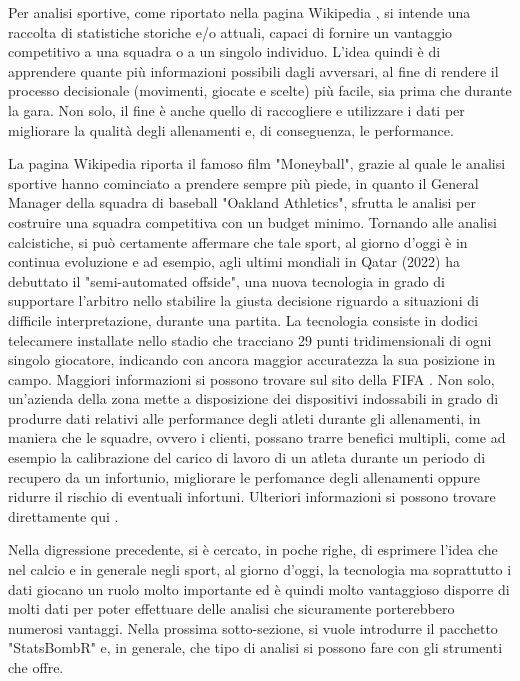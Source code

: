         Per analisi sportive, come riportato nella pagina Wikipedia \cite{SportAnalytics}, si intende una raccolta di statistiche storiche e/o attuali, capaci di fornire un vantaggio competitivo a una squadra o a un singolo individuo. L'idea quindi è di apprendere quante più informazioni possibili dagli avversari, al fine di rendere il processo decisionale (movimenti, giocate e scelte) più facile, sia prima che durante la gara. Non solo, il fine è anche quello di raccogliere e utilizzare i dati per migliorare la qualità degli allenamenti e, di conseguenza, le performance. 
        
        La pagina Wikipedia riporta il famoso film "Moneyball", grazie al quale le analisi sportive hanno cominciato a prendere sempre più piede, in quanto il General Manager della squadra di baseball "Oakland Athletics", sfrutta le analisi per costruire una squadra competitiva con un budget minimo. Tornando alle analisi calcistiche, si può certamente affermare che tale sport, al giorno d'oggi è in continua evoluzione e ad esempio, agli ultimi mondiali in Qatar (2022) ha debuttato il "semi-automated offside", una nuova tecnologia in grado di supportare l'arbitro nello stabilire la giusta decisione riguardo a situazioni di difficile interpretazione, durante una partita. La tecnologia consiste in dodici telecamere installate nello stadio che tracciano 29 punti tridimensionali di ogni singolo giocatore, indicando con ancora maggior accuratezza la sua posizione in campo. Maggiori informazioni si possono trovare sul sito della FIFA \cite{Semi-auto-offside}. Non solo, un'azienda della zona mette a disposizione dei dispositivi indossabili in grado di produrre dati relativi alle performance degli atleti durante gli allenamenti, in maniera che le squadre, ovvero i clienti, possano trarre benefici multipli, come ad esempio la calibrazione del carico di lavoro di un atleta durante un periodo di recupero da un infortunio, migliorare le perfomance degli allenamenti oppure ridurre il rischio di eventuali infortuni. Ulteriori informazioni si possono trovare direttamente qui \cite{gpexe}.

        Nella digressione precedente, si è cercato, in poche righe, di esprimere l'idea che nel calcio e in generale negli sport, al giorno d'oggi, la tecnologia ma soprattutto i dati giocano un ruolo molto importante ed è quindi molto vantaggioso disporre di molti dati per poter effettuare delle analisi che sicuramente porterebbero numerosi vantaggi. Nella prossima sotto-sezione, si vuole introdurre il pacchetto "StatsBombR" e, in generale, che tipo di analisi si possono fare con gli strumenti che offre.
    
